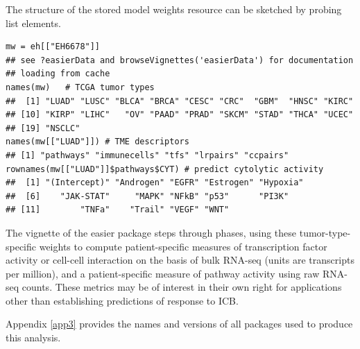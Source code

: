 The structure of the stored model weights resource can be sketched by probing list elements.

\begin{shaded}
\begin{verbatim}
mw = eh[["EH6678"]]
## see ?easierData and browseVignettes('easierData') for documentation
## loading from cache
names(mw)   # TCGA tumor types
##  [1] "LUAD" "LUSC" "BLCA" "BRCA" "CESC" "CRC"  "GBM"  "HNSC" "KIRC"
## [10] "KIRP" "LIHC"   "OV" "PAAD" "PRAD" "SKCM" "STAD" "THCA" "UCEC"
## [19] "NSCLC"
names(mw[["LUAD"]]) # TME descriptors
## [1] "pathways" "immunecells" "tfs" "lrpairs" "ccpairs"
rownames(mw[["LUAD"]]$pathways$CYT) # predict cytolytic activity
##  [1] "(Intercept)" "Androgen" "EGFR" "Estrogen" "Hypoxia"
##  [6]    "JAK-STAT"     "MAPK" "NFkB" "p53"      "PI3K"
## [11]        "TNFa"    "Trail" "VEGF" "WNT"
\end{verbatim}
\end{shaded}


The vignette of the easier package steps through phases,
using these tumor-type-specific weights to compute patient-specific measures
of transcription factor activity or cell-cell interaction on the basis of bulk
RNA-seq (units are transcripts per million), and a patient-specific
measure of pathway activity using raw RNA-seq counts. These metrics
may be of interest in their own right for applications other than
establishing predictions of response to ICB.

Appendix \ref{app3} provides the names and versions of all packages
used to produce this analysis.

